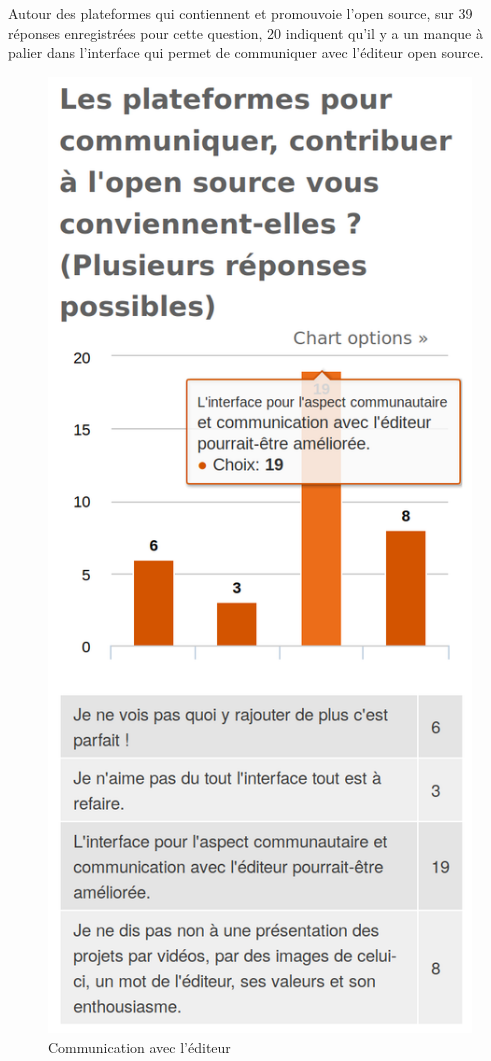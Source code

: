 			Autour des plateformes qui contiennent et promouvoie l'open source, sur 39 réponses enregistrées pour cette question, 20 indiquent qu'il y a un manque à palier dans l'interface qui permet de communiquer avec l'éditeur open source. 

			\begin{figure}[!htb]
				\center
				\includegraphics[scale=0.28]{./img/a9}
				\caption{Communication avec l'éditeur}
			\end{figure}

